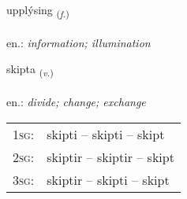 \documentclass[frontgrid, backgrid]{flacards}\usepackage[]{graphicx}\usepackage[]{xcolor}
\begin{document}
\renewcommand{\blhead}{\vskip5pt {\small\bfseries\footnotesize Nafnorð | Noun }}
\renewcommand{\bcfoot}{\vskip5pt \hspace{2pt}{\small\bfseries\footnotesize 1K}}


{upplýsing \small{\textsubscript{(\textit{f.})}} \\[1ex] %
\textphonetic{[ʏhplisiŋk]} \\
en.: \emph{information; illumination} \\  [2ex]
\renewcommand*{\arraystretch}{0.8}
}

\renewcommand{\flhead}{\vskip5pt \fboxsep=0pt {\small\bfseries\footnotesize Sagnorð | Verb}}
\renewcommand{\fcfoot}{\vskip5pt \fboxsep=0pt \hspace{2pt}{\small\bfseries\footnotesize 1K}}

\renewcommand{\blhead}{\vskip5pt {\small\bfseries\footnotesize Sagnorð | Verb }}
\renewcommand{\bcfoot}{\vskip5pt \hspace{2pt}{\small\bfseries\footnotesize 1K}}


{skipta \small{\textsubscript{(\textit{v.})}} \\[1ex] %
\textphonetic{[scɪfta]} \\
en.: \emph{divide; change; exchange} \\  [2ex]
\renewcommand*{\arraystretch}{0.8}
\begin{tabular}{p{1cm}l}
\textsc{1sg}: & skipti -- skipti -- skipt \\ 
\textsc{2sg}: & skiptir -- skiptir -- skipt \\ 
\textsc{3sg}: & skiptir -- skipti -- skipt \\ 
\end{tabular}
}
\end{document}
